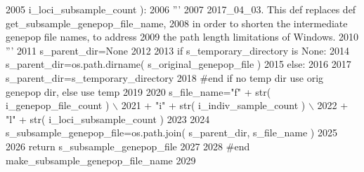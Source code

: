 \begin{DoxyCode}
2005                                                         i\_loci\_subsample\_count ):
2006         \textcolor{stringliteral}{'''}
2007 \textcolor{stringliteral}{        2017\_04\_03.  This def replaces def get\_subsample\_genepop\_file\_name,}
2008 \textcolor{stringliteral}{        in order to shorten the intermediate genepop file names, to address}
2009 \textcolor{stringliteral}{        the path length limitations of Windows.}
2010 \textcolor{stringliteral}{        '''}
2011         s\_parent\_dir=\textcolor{keywordtype}{None}
2012 
2013         \textcolor{keywordflow}{if} s\_temporary\_directory \textcolor{keywordflow}{is} \textcolor{keywordtype}{None}:
2014             s\_parent\_dir=os.path.dirname( s\_original\_genepop\_file )
2015         \textcolor{keywordflow}{else}:
2016 
2017             s\_parent\_dir=s\_temporary\_directory  
2018         \textcolor{comment}{#end if no temp dir use orig genepop dir, else use temp}
2019 
2020         s\_file\_name=\textcolor{stringliteral}{"f"} + str( i\_genepop\_file\_count ) \(\backslash\)
2021                     + \textcolor{stringliteral}{"i"} + str( i\_indiv\_sample\_count ) \(\backslash\)
2022                     + \textcolor{stringliteral}{"l"} + str( i\_loci\_subsample\_count )
2023 
2024         s\_subsample\_genepop\_file=os.path.join( s\_parent\_dir, s\_file\_name )
2025         
2026         \textcolor{keywordflow}{return} s\_subsample\_genepop\_file
2027 
2028 \textcolor{comment}{#end make\_subsample\_genepop\_file\_name}
2029 
\end{DoxyCode}
